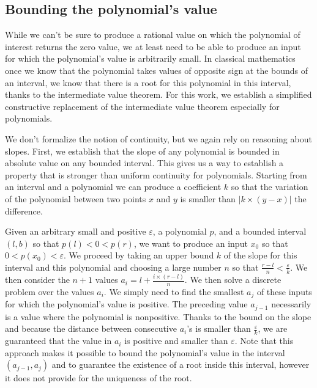 \documentclass{mscs}
\begin{document}
\subsection{Bounding the polynomial's value}
While we can't be sure to produce a rational value on which the
polynomial of interest returns the zero value, we at least need to be
able to produce an input for which the polynomial's value is
arbitrarily small. In classical mathematics once we know that the
polynomial takes values of opposite sign at the bounds of an interval,
we know that there is a root for this polynomial in this interval,
thanks to the intermediate value theorem. For this work, we establish
a simplified constructive replacement of the intermediate value
theorem especially for polynomials.

We don't formalize the notion of continuity, but we again rely on
reasoning about slopes. First, we establish that the slope of any
polynomial is bounded in absolute value on any bounded interval. This
gives us a way to establish a property that is stronger than uniform
continuity for polynomials. Starting from an interval and a polynomial
we can produce a coefficient \(k\) so that the variation of the
polynomial between two points \(x\) and \(y\) is smaller than
\(|k\times(y-x)|\) the difference.

Given an arbitrary small and positive \(\varepsilon\), a polynomial
\(p\), and a bounded interval \((l,b)\) so that \(p(l) < 0 < p(r)\),
we want to produce an input \(x_0\) so that \(0 < p(x_0) <
\varepsilon\).  We proceed by taking an upper bound \(k\) of the slope for
this interval and this polynomial and choosing a large number \(n\) so
that \(\frac{r-l}{n} < \frac{\varepsilon}{k}\).  We then consider the
\(n+1\) values \(a_i =l + \frac{i\times (r-l)}{n}\). We then solve a
discrete problem over the values \(a_i\). We simply need to find the
smallest \(a_j\) of these inputs for which the polynomial's value is
positive. The preceding value \(a_{j-1}\) necessarily is a value where
the polynomial is nonpositive. Thanks to the bound on the slope and
because the distance between consecutive \(a_i\)'s is smaller than
\(\frac{\varepsilon}{k}\), we are guaranteed that the value in \(a_i\)
is positive and smaller than \(\varepsilon\).  Note that this approach
makes it possible to bound the polynomial's value in the interval
\((a_{j-1},a_j)\) and to guarantee the existence of a root inside this
interval, however it does not provide for the uniqueness of the root.
\end{document}
